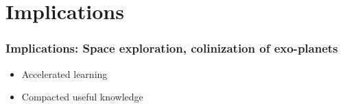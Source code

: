 \chapter{Implications}


\subsection{Implications: Space exploration, colinization of exo-planets}

\begin{itemize}
 \item Accelerated learning
 \item Compacted useful knowledge
\end{itemize}

